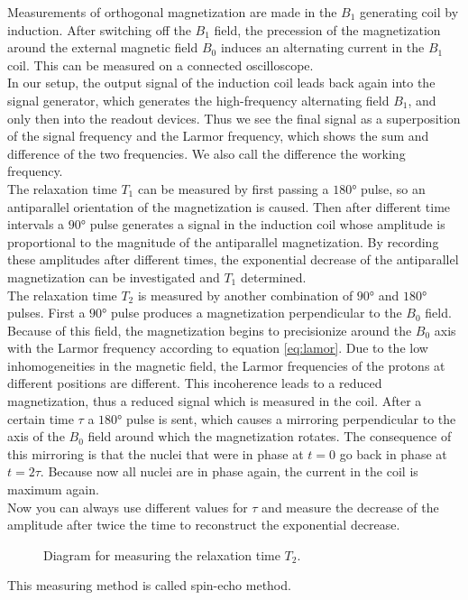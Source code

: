 Measurements of orthogonal magnetization are made in the $B_1$ generating coil by induction.
After switching off the $B_1$ field, the precession of the magnetization around the external magnetic field $B_0$ induces an alternating current in the $B_1$ coil.
This can be measured on a connected oscilloscope.\\
In our setup, the output signal of the induction coil leads back again into the signal generator, which generates the high-frequency alternating field $B_1$, and only then into the readout devices.
Thus we see the final signal as a superposition of the signal frequency and the Larmor frequency, which shows the sum and difference of the two frequencies.
We also call the difference the working frequency.\\

The relaxation time $T_1$ can be measured by first passing a $\ang{180}$ pulse, so an antiparallel orientation of the magnetization is caused.
Then after different time intervals a $\ang{90}$ pulse generates a signal in the induction coil whose amplitude is proportional to the magnitude of the antiparallel magnetization.
By recording these amplitudes after different times, the exponential decrease of the antiparallel magnetization can be investigated and $T_1$ determined.\\

The relaxation time $T_2$ is measured by another combination of $\ang{90}$ and $\ang{180}$ pulses.
First a $\ang{90}$ pulse produces a magnetization perpendicular to the $B_0$ field.
Because of this field, the magnetization begins to precisionize around the $B_0$ axis with the Larmor frequency according to equation \ref{eq:lamor}.
Due to the low inhomogeneities in the magnetic field, the Larmor frequencies of the protons at different positions are different.
This incoherence leads to a reduced magnetization, thus a reduced signal which is measured in the coil.
After a certain time $\tau$ a $\ang{180}$ pulse is sent, which causes a mirroring perpendicular to the axis of the $B_0$ field around which the magnetization rotates.
The consequence of this mirroring is that the nuclei that were in phase at $t=0$ go back in phase at $t=2\tau$.
Because now all nuclei are in phase again, the current in the coil is maximum again.\\
Now you can always use different values for $\tau$ and measure the decrease of the amplitude after twice the time to reconstruct the exponential decrease.
\begin{figure}[ht]
\centering

\caption{Diagram for measuring the relaxation time $T_2$.}
\label{fig:relaxation}
\end{figure}
This measuring method is called spin-echo method.\\

